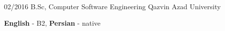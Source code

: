 \documentclass[8pt]{developercv} %
\begin{document}
    \vspace{-10 pt}
    \begin{entrylist}
        \entry
        {02/2016}
        {B.Sc, Computer Software Engineering}
        {Qazvin Azad University}
        {}
    \end{entrylist}

    \vspace{-10 pt}
    \vspace{-6pt}

    \hspace{26mm} \textbf{English} - B2, \textbf{Persian} - native

\end{document}

